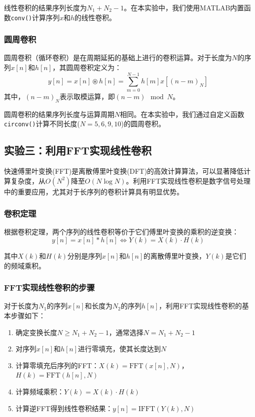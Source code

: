 \documentclass[12pt,hyperref,a4paper,UTF8]{ctexart}
\begin{document}
线性卷积的结果序列长度为$N_1+N_2-1$。在本实验中，我们使用MATLAB内置函数\texttt{conv()}计算序列$x$和$h$的线性卷积。

\subsubsection{圆周卷积}
圆周卷积（循环卷积）是在周期延拓的基础上进行的卷积运算。对于长度为$N$的序列$x[n]$和$h[n]$，其圆周卷积定义为：
\begin{equation}
y[n] = x[n] \circledast h[n] = \sum_{m=0}^{N-1} h[m]x[(n-m)_N]
\end{equation}
其中，$(n-m)_N$表示取模运算，即$(n-m) \mod N$。

圆周卷积的结果序列长度与运算周期$N$相同。在本实验中，我们通过自定义函数\texttt{circonv()}计算不同长度($N=5,6,9,10$)的圆周卷积。

\subsection{实验三：利用FFT实现线性卷积}

快速傅里叶变换(FFT)是离散傅里叶变换(DFT)的高效计算算法，可以显著降低计算复杂度，从$O(N^2)$降至$O(N\log N)$。利用FFT实现线性卷积是数字信号处理中的重要应用，尤其对于长序列的卷积计算具有明显优势。

\subsubsection{卷积定理}
根据卷积定理，两个序列的线性卷积等价于它们傅里叶变换的乘积的逆变换：
\begin{equation}
y[n] = x[n] * h[n] \Leftrightarrow Y(k) = X(k) \cdot H(k)
\end{equation}

其中$X(k)$和$H(k)$分别是序列$x[n]$和$h[n]$的离散傅里叶变换，$Y(k)$是它们的频域乘积。

\subsubsection{FFT实现线性卷积的步骤}
对于长度为$N_1$的序列$x[n]$和长度为$N_2$的序列$h[n]$，利用FFT实现线性卷积的基本步骤如下：

\begin{enumerate}
    \item 确定变换长度$N \geq N_1 + N_2 - 1$，通常选择$N = N_1 + N_2 - 1$
    \item 对序列$x[n]$和$h[n]$进行零填充，使其长度达到$N$
    \item 计算零填充后序列的FFT：$X(k) = \text{FFT}(x[n], N)$，$H(k) = \text{FFT}(h[n], N)$
    \item 计算频域乘积：$Y(k) = X(k) \cdot H(k)$
    \item 计算逆FFT得到线性卷积结果：$y[n] = \text{IFFT}(Y(k), N)$
\end{enumerate}
\end{document}

